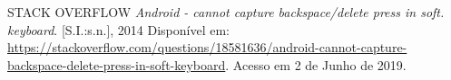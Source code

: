 \documentclass[
    12pt,       %
    openright,      %
    twoside,      %
    a4paper,      %
    english,      %
    french,       %
    spanish,      %
    brazil,       %
    ]{abntex2}
\begin{document}
  \noindent
  STACK OVERFLOW \textit{Android - cannot capture backspace/delete press in soft. keyboard}. [S.I.:s.n.], 2014 Disponível em:
  \url{https://stackoverflow.com/questions/18581636/android-cannot-capture-backspace-delete-press-in-soft-keyboard}. Acesso em 2 de Junho de 2019.














\end{document}
